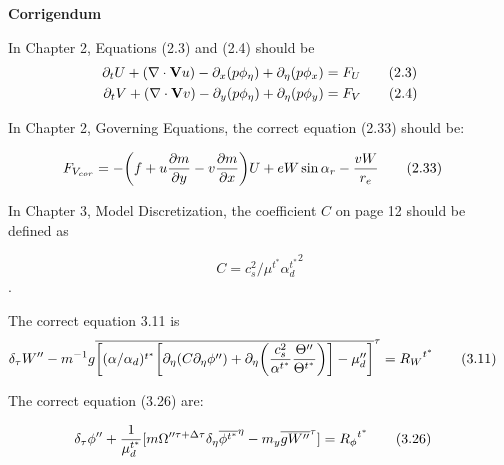 \documentclass[12pt]{book}
\begin{document}
\pagestyle{plain}


\setlength{\parskip}{0.08in}
\LARGE 
\begin{center} 
\centering
\textbf {Corrigendum}
\end{center}

\normalsize
\noindent

\noindent
In Chapter 2, Equations (2.3) and (2.4) should be
\begin{align}
 \partial_t U + (\nabla \cdot {\bf V} u )
- \partial_x (p\phi_\eta)
+ \partial_\eta (p\phi_x) &= F_U
\tag{2.3}
\\
%
 \partial_t V + (\nabla \cdot {\bf V} v )
- \partial_y (p\phi_\eta)
+ \partial_\eta (p\phi_y) &= F_V 
\tag{2.4}
%
\end{align}

\noindent
In Chapter 2, Governing Equations, the correct equation (2.33) should be:
\setlength{\parskip}{0.00in}

\begin{align}
%
F_{V_{cor}} & = - \biggl(f + u {\partial m \over
\partial y} - v {\partial m \over \partial x}\biggr) U
+ e W \sin \alpha_r - {vW \over r_e}
\tag{2.33}
\end{align}

\noindent
In Chapter 3, Model Discretization, the coefficient $C$ on page 12
should be defined as 

$$C=c_s^2/\mu^{t^*}{\alpha^{t^*}_d}^2$$.

\noindent
The correct equation 3.11 is
\begin{align}
 \delta_\tau W'' 
- m^{-1} g\overline{\left[(\alpha/\alpha_d)^{t^*} \biggl[
     \partial_\eta (C \partial_\eta \phi'') 
   + \partial_\eta\biggl({c_s^2\over\alpha^{t^*}}{\Theta''\over\Theta^{t^*}}\biggr)\biggr]
- \mu_d''\right]}^\tau
                                                   &= {R_W}^{t^*}  
\tag{3.11}
\end{align}


\noindent
The correct equation (3.26) are:

\begin{align}
 \delta_\tau \phi'' + {1\over\mu_d^{t^*}}
[
 m \Omega''^{\tau+\Delta \tau} \delta_\eta \overline{\phi^{t^*}}^\eta  - m_y\overline{g W''}^\tau ]
&= {R_\phi}^{t^*}
\tag{3.26}
\end{align}
\end{document}
